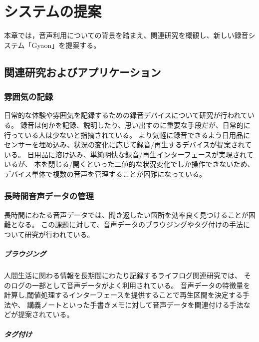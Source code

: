 \chapter{システムの提案}
\label{chap:proposal}

本章では，音声利用についての背景を踏まえ、関連研究を概観し、新しい録音システム「Gyaon」を提案する。

\newpage

\section{関連研究およびアプリケーション}

\subsection{雰囲気の記録}

日常的な体験や雰囲気を記録するための録音デバイスについて研究が行われている\cite{Poupyrev}。
録音は何かを記録、説明したり、思い出すのに重要な手段だが、日常的に行っている人は少ないと指摘されている。
より気軽に録音できるよう日用品にセンサーを埋め込み、状況の変化に応じて録音/再生するデバイスが提案されている。
日用品に溶け込み、単純明快な録音/再生インターフェースが実現されているが、
本を閉じる/開くといった二値的な状況変化でしか操作できないため、
デバイス単体で複数の音声を管理することが困難になっている。

\subsection{長時間音声データの管理}

長時間にわたる音声データでは、聞き返したい箇所を効率良く見つけることが困難となる。
この課題に対して、音声データのブラウジングやタグ付けの手法について研究が行われている。

\paragraph*{ブラウジング}

人間生活に関わる情報を長期間にわたり記録するライフログ関連研究では、
そのログの一部として音声データがよく利用されている\cite{Bell}。
音声データの特徴量を計算し,閾値処理するインターフェースを提供することで再生区間を決定する手法\cite{Kawamura}や、
講義ノートといった手書きメモに対して音声データを関連付ける手法\cite{Stifelman}などが提案されている。

\paragraph*{タグ付け}

